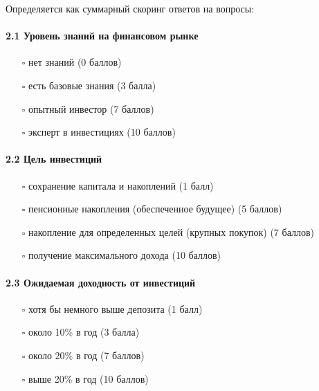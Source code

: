 \documentclass[11pt]{article}
\providecommand{\tightlist}{%
      \setlength{\itemsep}{0pt}\setlength{\parskip}{0pt}}
\begin{document}
Определяется как суммарный скоринг ответов на вопросы:

\paragraph{2.1 Уровень знаний на финансовом
рынке}\label{ux443ux440ux43eux432ux435ux43dux44c-ux437ux43dux430ux43dux438ux439-ux43dux430-ux444ux438ux43dux430ux43dux441ux43eux432ux43eux43c-ux440ux44bux43dux43aux435}

\begin{itemize}
\tightlist
\item[$\square$]
  нет знаний (0 баллов)
\item[$\square$]
  есть базовые знания (3 балла)
\item[$\square$]
  опытный инвестор (7 баллов)
\item[$\square$]
  эксперт в инвестициях (10 баллов)
\end{itemize}

\paragraph{2.2 Цель
инвестиций}\label{ux446ux435ux43bux44c-ux438ux43dux432ux435ux441ux442ux438ux446ux438ux439}

\begin{itemize}
\tightlist
\item[$\square$]
  сохранение капитала и накоплений (1 балл)
\item[$\square$]
  пенсионные накопления (обеспеченное будущее) (5 баллов)
\item[$\square$]
  накопление для определенных целей (крупных покупок) (7 баллов)
\item[$\square$]
  получение максимального дохода (10 баллов)
\end{itemize}

\paragraph{2.3 Ожидаемая доходность от
инвестиций}\label{ux43eux436ux438ux434ux430ux435ux43cux430ux44f-ux434ux43eux445ux43eux434ux43dux43eux441ux442ux44c-ux43eux442-ux438ux43dux432ux435ux441ux442ux438ux446ux438ux439}

\begin{itemize}
\tightlist
\item[$\square$]
  хотя бы немного выше депозита (1 балл)
\item[$\square$]
  около 10\% в год (3 балла)
\item[$\square$]
  около 20\% в год (7 баллов)
\item[$\square$]
  выше 20\% в год (10 баллов)
\end{itemize}
\end{document}
